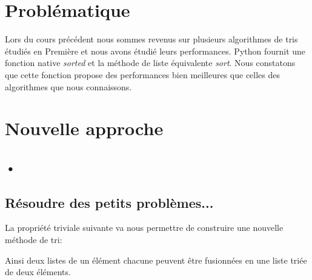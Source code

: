 \documentclass[a4paper,11pt]{article}
\begin{document}
\begin{Form}
\section{Problématique}
Lors du cours précédent nous sommes revenus sur plusieurs algorithmes de tris étudiés en Première et nous avons étudié leurs performances. Python fournit une fonction native \emph{sorted} et la méthode de liste équivalente \emph{sort}. Nous constatons que cette fonction propose des performances bien meilleures que celles des algorithmes que nous connaissons.
\begin{center}
\end{center}
\section{Nouvelle approche}
\subsection{•}
\subsection{Résoudre des petits problèmes...}
La propriété triviale suivante va nous permettre de construire une nouvelle méthode de tri:
\begin{center}
\end{center}
\begin{figure}[!h]
\centering
{}
\end{figure}
Ainsi deux listes de un élément chacune peuvent être fusionnées en une liste triée de deux éléments.
\begin{figure}[!h]
\centering
{}
\end{figure}
\end{Form}
\end{document}
